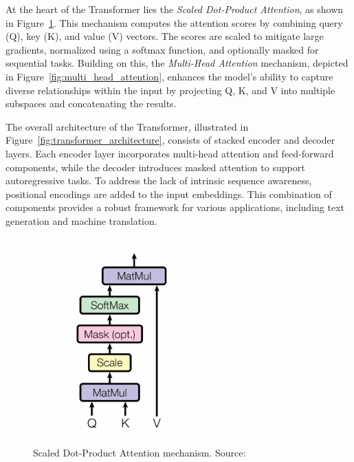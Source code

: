 At the heart of the Transformer lies the \textit{Scaled Dot-Product Attention}, as shown in Figure~\ref{fig:scaled_attention}. This mechanism computes the attention scores by combining query (Q), key (K), and value (V) vectors. The scores are scaled to mitigate large gradients, normalized using a softmax function, and optionally masked for sequential tasks. Building on this, the \textit{Multi-Head Attention} mechanism, depicted in Figure~\ref{fig:multi_head_attention}, enhances the model's ability to capture diverse relationships within the input by projecting Q, K, and V into multiple subspaces and concatenating the results.

The overall architecture of the Transformer, illustrated in Figure~\ref{fig:transformer_architecture}, consists of stacked encoder and decoder layers. Each encoder layer incorporates multi-head attention and feed-forward components, while the decoder introduces masked attention to support autoregressive tasks. To address the lack of intrinsic sequence awareness, positional encodings are added to the input embeddings. This combination of components provides a robust framework for various applications, including text generation and machine translation.

\begin{figure}[h!]
    \centering
    \includegraphics[width=0.55\textwidth]{Assets/scaled_dot_product_attention.png}
    \caption{Scaled Dot-Product Attention mechanism. Source: \cite{11}}
    \label{fig:scaled_attention}
\end{figure}

